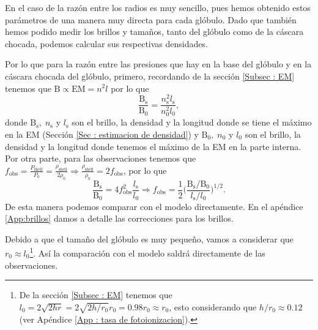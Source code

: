 \documentclass{book}
\begin{document}
En el caso de la razón entre los radios es muy sencillo, pues hemos obtenido estos parámetros de una manera muy directa para cada glóbulo.
Dado que también hemos podido medir los brillos y tamaños, tanto del glóbulo como de la cáscara chocada, podemos calcular sus respectivas densidades.

Por lo que para la razón entre las presiones que hay en la base del glóbulo y en la cáscara chocada del glóbulo, primero, recordando de la sección \ref{Subsec : EM} tenemos que $\mathrm{B}\propto \mathrm{EM}=n^2l$ por lo que
\begin{equation}
\frac{\mathrm{B_\mathrm{s}}}{\mathrm{B_0}}=\frac{n_\mathrm{s}^2l_\mathrm{s}}{n_0^2l_0},
\end{equation}
donde $\mathrm{B_\mathrm{s}}, \; n_\mathrm{s}$ y $l_\mathrm{s}$ son el brillo, la densidad y la longitud donde se tiene el máximo en la EM (Sección \ref{Sec : estimacion de densidad}) y  $\mathrm{B_0}, \; n_0$ y $l_0$ son el brillo, la densidad y la longitud donde tenemos el máximo de la EM en la parte interna. Por otra parte, para las observaciones tenemos que $f_\mathrm{obs} = \frac{P_\mathrm{shell}}{P_0}=\frac{\rho_\mathrm{shell}}{2\rho_0} \Rightarrow \frac{\rho_\mathrm{shell}}{\rho_0}=2f_\mathrm{obs}$, por lo que
\begin{equation}
\frac{\mathrm{B_\mathrm{s}}}{\mathrm{B_0}}=4f_\mathrm{obs}^2\frac{l_\mathrm{s}}{l_0}\Rightarrow f_\mathrm{obs}= \frac{1}{2}\Big(\frac{\mathrm{B_\mathrm{s}}/\mathrm{B_0}}{l_\mathrm{s}/l_0}\Big)^{1/2}.
\end{equation}
De esta manera podemos comparar con el modelo directamente. En el apéndice \ref{App:brillos} damos a detalle las correcciones para los brillos.

Debido a que el tamaño del glóbulo es muy pequeño, vamos a considerar que $r_0\approx l_0$\footnote{De la sección \ref{Subsec : EM} tenemos que $l_0=2\sqrt{2hr}=2\sqrt{2h/r_0}r_0=0.98 r_0\approx r_0$, esto considerando que $h/r_0\approx0.12$ (ver Apéndice \ref{App : tasa de fotoionizacion}).}. Así la comparación con el modelo saldrá directamente de las observaciones. 
\end{document}
